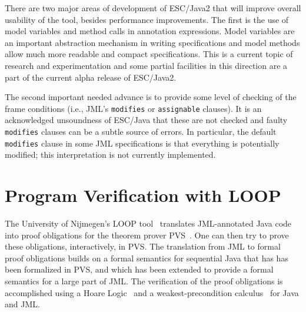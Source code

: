 
There are two major areas of development of ESC/\-Java2 that will
improve overall usability of the tool, besides performance
improvements.  The first is the use of model variables and method
calls in annotation expressions.  Model variables are an important
abstraction mechanism in writing specifications and model methods
allow much more readable and compact specifications.  This is a
current topic of research and experimentation and some partial
facilities in this direction are a part of the current alpha release
of ESC/Java2.

The second important needed advance is to provide some level of
checking of the frame conditions (i.e., JML's \texttt{modifies} or
\texttt{assignable} clauses).  It is an acknowledged unsoundness of
ESC/Java that these are not checked and faulty \texttt{modifies}
clauses can be a subtle source of errors.  In particular, the default
\texttt{modifies} clause in some JML specifications is that everything
is potentially modified; this interpretation is not currently
implemented.

\section{Program Verification with LOOP}
\label{loop}

The University of Nijmegen's LOOP tool~\cite{Jacobs-etal98,Huisman01}
translates JML-annotated Java code into proof obligations for the
theorem prover PVS~\cite{OwreRRSS96}.  One can then try to prove these
obligations, interactively, in PVS\@.  The translation from JML to
formal proof obligations builds on a formal semantics for sequential
Java that has has been formalized in PVS, and which has been extended
to provide a formal semantics for a large part of JML\@.  The
verification of the proof obligations is accomplished using a Hoare
Logic~\cite{JacobsPoll01a} and a weakest-precondition
calculus~\cite{Jacobs03} for Java and JML\@.


